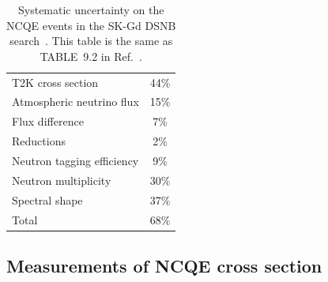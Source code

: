 \begin{table}[h]
	\caption[Systematic uncertainty on the NCQE events in the SK-Gd DSNB search]{
	Systematic uncertainty on the NCQE events in the SK-Gd DSNB search~\cite{2023HaradaPhD}.
	This table is the same as TABLE~9.2 in Ref.~\cite{2023HaradaPhD}.
	}\label{Introd_Tab:SystNCQE}
	\centering
	\vs
	\begin{tabular}{lc} \hline \hline
		T2K cross section          & 44\% \\
		Atmospheric neutrino flux  & 15\% \\
		Flux difference            & 7\%  \\
		Reductions                 & 2\%  \\
		Neutron tagging efficiency & 9\%  \\
		Neutron multiplicity       & 30\% \\
		Spectral shape             & 37\% \\ \hline
		Total                      & 68\% \\ \hline \hline
	\end{tabular}
\end{table}





\subsection{Measurements of NCQE cross section}\label{Subsec_MeasurementsNCQE}
